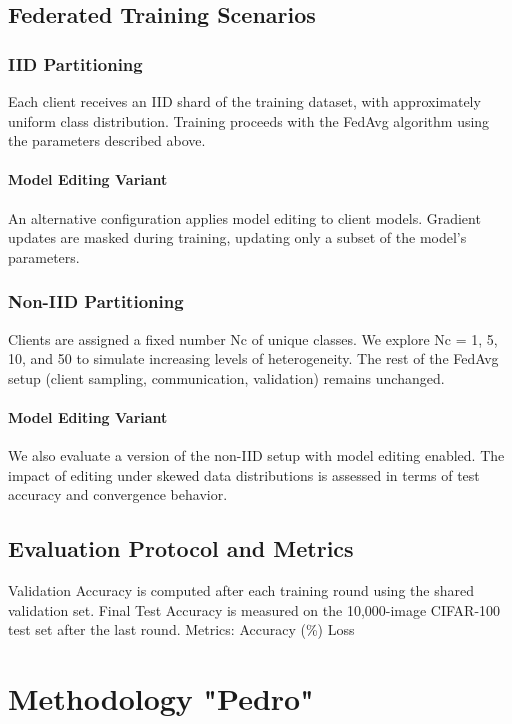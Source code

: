 \documentclass[10pt,twocolumn,letterpaper]{article}
\begin{document}
\subsection{Federated Training Scenarios}
\subsubsection{IID Partitioning}
Each client receives an IID shard of the training dataset, with approximately uniform class distribution. Training proceeds with the FedAvg algorithm using the parameters described above.

\paragraph{Model Editing Variant}
An alternative configuration applies model editing to client models. Gradient updates are masked during training, updating only a subset of the model's parameters.

\subsubsection{Non-IID Partitioning}
Clients are assigned a fixed number Nc of unique classes. We explore Nc = 1, 5, 10, and 50 to simulate increasing levels of heterogeneity. The rest of the FedAvg setup (client sampling, communication, validation) remains unchanged.

\paragraph{Model Editing Variant}
We also evaluate a version of the non-IID setup with model editing enabled. The impact of editing under skewed data distributions is assessed in terms of test accuracy and convergence behavior.



\subsection{Evaluation Protocol and Metrics}
Validation Accuracy is computed after each training round using the shared validation set. Final Test Accuracy is measured on the 10,000-image CIFAR-100 test set after the last round. Metrics: Accuracy (\%) Loss




\section{Methodology "Pedro"}
\label{sec:method2}
\end{document}
